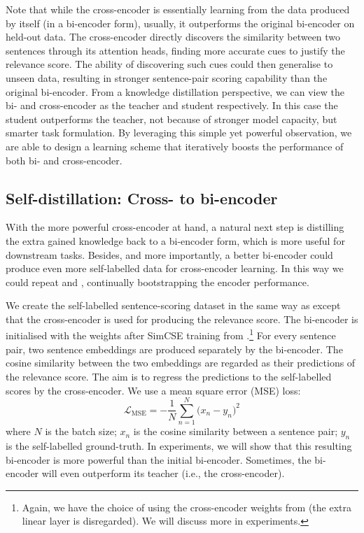 \documentclass{article} \usepackage{iclr2021_conference,times}
\begin{document}
Note that while the cross-encoder is essentially learning from the data produced by itself (in a bi-encoder form), usually, it outperforms the original bi-encoder on held-out data.
The cross-encoder directly discovers the similarity between two sentences through its attention heads, finding more accurate cues to justify the relevance score. 
The ability of discovering such cues could then generalise to unseen data, resulting in stronger sentence-pair scoring capability than the original bi-encoder. From a knowledge distillation perspective, we can view the bi- and cross-encoder as the teacher and student respectively. In this case the student outperforms the teacher, not because of stronger model capacity, but smarter task formulation. By leveraging this simple yet powerful observation, we are able to design a learning scheme that iteratively boosts the performance of both bi- and cross-encoder.

\subsection{Self-distillation: Cross- to bi-encoder}\label{sec:cross_to_bi}

With the more powerful cross-encoder at hand, a natural next step is distilling the extra gained knowledge back to a bi-encoder form, which is more useful for downstream tasks. Besides, and more importantly, a better bi-encoder could produce even more self-labelled data for cross-encoder learning.  In this way we could repeat  and , continually bootstrapping the encoder performance.

We create the self-labelled sentence-scoring dataset in the same way as  except that the cross-encoder is used for producing the relevance score. The bi-encoder is initialised with the weights after SimCSE training from .\footnote{Again, we have the choice of using the cross-encoder weights from  (the extra linear layer is disregarded). We will discuss more in experiments.} For every sentence pair, two sentence embeddings are produced separately by the bi-encoder. The cosine similarity between the two embeddings are regarded as their predictions of the relevance score. The aim is to regress the predictions to the self-labelled scores by the cross-encoder. We use a mean square error (MSE) loss:
\begin{equation}
    \mathcal{L}_{\text{MSE}} = - \frac{1}{N}\sum_{n=1}^{N} \Big(x_n - y_n \Big)^2
    \label{eq:mse}
\end{equation}
where $N$ is the batch size; $x_n$ is the cosine similarity between a sentence pair; $y_n$ is the self-labelled ground-truth. In experiments, we will show that this resulting bi-encoder is more powerful than the initial bi-encoder. Sometimes, the bi-encoder will even outperform its teacher (i.e., the cross-encoder). 
\end{document}
